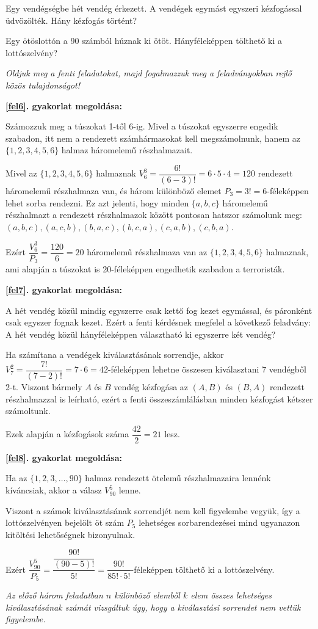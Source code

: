 \begin{problem}
\label{fel7} Egy vendégségbe hét vendég érkezett. A vendégek egymást
egyszeri kézfogással üdvözölték. Hány kézfogás történt? 
\end{problem}

\begin{problem}
\label{fel8} Egy ötöslottón a 90 számból húznak ki ötöt. Hányféleképpen
tölthető ki a lottószelvény? 
\end{problem}

\textit{Oldjuk meg a fenti feladatokat, majd fogalmazzuk meg a feladványokban
rejlő közös tulajdonságot!}
\begin{solution}
{\bf\ref{fel6}. gyakorlat megoldása:}

Számozzuk meg a túszokat 1-től 6-ig. Mivel a túszokat egyszerre engedik
szabadon, itt nem a rendezett számhármasokat kell megszámolnunk, hanem
az $\{1,2,3,4,5,6\}$ halmaz háromelemű részhalmazait.

Mivel az $\{1,2,3,4,5,6\}$ halmaznak $V_{6}^{3}=\dfrac{6!}{(6-3)!}=6\cdot5\cdot4=120$
rendezett háromelemű részhalmaza van, és három különböző elemet $P_{3}=3!=6$-féleképpen
lehet sorba rendezni. Ez azt jelenti, hogy minden $\{a,b,c\}$ háromelemű
részhalmazt a rendezett részhalmazok között pontosan hatszor számolunk
meg: $(a,b,c),(a,c,b),(b,a,c),(b,c,a),(c,a,b),(c,b,a)$.

Ezért $\dfrac{V_{6}^{3}}{P_{3}}=\dfrac{120}{6}=20$ háromelemű részhalmaza
van az $\{1,2,3,4,5,6\}$ halmaznak, ami alapján a túszokat is 20-féleképpen
engedhetik szabadon a terroristák.

{\bf\ref{fel7}. gyakorlat megoldása:}

A hét vendég közül mindig egyszerre csak kettő fog kezet egymással,
és páronként csak egyszer fognak kezet. Ezért a fenti kérdésnek megfelel
a következő feladvány: A hét vendég közül hányféleképpen választható
ki egyszerre két vendég?

Ha számítana a vendégek kiválasztásának sorrendje, akkor $V_{7}^{2}=\dfrac{7!}{(7-2)!}=7\cdot6=42$-féleképpen
lehetne összesen kiválasztani 7 vendégből 2-t. Viszont bármely $A$
és $B$ vendég kézfogása az $(A,B)$ és $(B,A)$ rendezett részhalmazzal
is leírható, ezért a fenti összeszámlálásban minden kézfogást kétszer
számoltunk.

Ezek alapján a kézfogások száma $\dfrac{42}{2}=21$ lesz.

{\bf\ref{fel8}. gyakorlat megoldása:}

Ha az $\{1,2,3,\ldots,90\}$ halmaz rendezett ötelemű részhalmazaira
lennénk kíváncsiak, akkor a válasz $V_{90}^{5}$ lenne.

Viszont a számok kiválasztásának sorrendjét nem kell figyelembe vegyük,
így a lottószelvényen bejelölt öt szám $P_{5}$ lehetséges sorbarendezései
mind ugyanazon kitöltési lehetőségnek bizonyulnak.

Ezért $\dfrac{V_{90}^{5}}{P_{5}}=\dfrac{\dfrac{90!}{(90-5)!}}{5!}=\dfrac{90!}{85!\cdot5!}$-féleképpen
tölthető ki a lottószelvény. 
\end{solution}
\textit{Az előző három feladatban $n$ különböző elemből $k$ elem
összes lehetséges kiválasztásának számát vizsgáltuk úgy, hogy a kiválasztási
sorrendet nem vettük figyelembe.}

